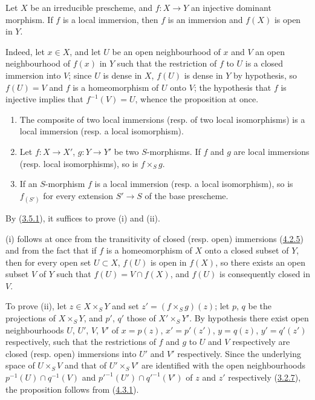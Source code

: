 \begin{proposition}[4.5.4]
\label{I.4.5.4}
Let $X$ be an irreducible prescheme, and $f:X\to Y$ an injective dominant
morphism. If $f$ is a local immersion, then $f$ is an immersion and $f(X)$
is open in $Y$.
\end{proposition}

Indeed, let $x\in X$, and let $U$ be an open neighbourhood of $x$ and $V$ an
open neighbourhood of $f(x)$ in $Y$ such that the restriction of $f$ to $U$
is a closed immersion into $V$; since $U$ is dense in $X$, $f(U)$
is dense in $Y$ by hypothesis, so $f(U)=V$ and $f$ is a homeomorphism
of $U$ onto $V$; the hypothesis that $f$ is injective implies that
$f^{-1}(V)=U$, whence the proposition at once.

\begin{proposition}[4.5.5]
\label{I.4.5.5}
\begin{enumerate}
  \item[\rm(i)] The composite of two local immersions (resp. of two
    local isomorphisms) is a local immersion (resp. a local
    isomorphism).
  \item[\rm(ii)] Let $f:X\to X'$, $g:Y\to Y'$ be two $S$-morphisms. If
    $f$ and $g$ are local immersions (resp. local isomorphisms),
    so is $f\times_S g$.
  \item[\rm(iii)] If an $S$-morphism $f$ is a local immersion (resp. a
    local isomorphism), so is $f_{(S')}$ for every extension
    $S'\to S$ of the base prescheme.
\end{enumerate}
\end{proposition}

By (\hyperref[I.3.5.1]{3.5.1}), it suffices to prove (i) and (ii).

(i) follows at once from the transitivity of closed (resp.
open) immersions (\hyperref[I.4.2.5]{4.2.5}) and from the fact that if $f$
is a homeomorphism of $X$ onto a closed subset of $Y$, then for every open set
$U\subset X$, $f(U)$ is open in $f(X)$, so there exists an open
subset $V$ of $Y$ such that $f(U)=V\cap f(X)$, and $f(U)$ is consequently
closed in $V$.

To prove (ii), let $z\in X\times_S Y$ and set $z'=(f\times_S g)(z)$; let $p$, $q$ be the projections of $X\times_S Y$, and $p'$,
$q'$ those of $X'\times_S Y'$. By hypothesis there exist open
neighbourhoods $U$, $U'$, $V$, $V'$ of $x=p(z)$, $x'=p'(z')$, $y=q(z)$,
$y'=q'(z')$ respectively, such that the restrictions of $f$ and $g$ to $U$
and $V$ respectively are closed (resp. open) immersions into
$U'$ and $V'$ respectively. Since the underlying space of $U\times_S V$ and
that of $U'\times_S V'$ are identified with the open neighbourhoods
$p^{-1}(U)\cap q^{-1}(V)$ and ${p'}^{-1}(U')\cap{q'}^{-1}(V')$ of $z$ and
$z'$ respectively (\hyperref[I.3.2.7]{3.2.7}), the proposition follows
from (\hyperref[I.4.3.1]{4.3.1}).
